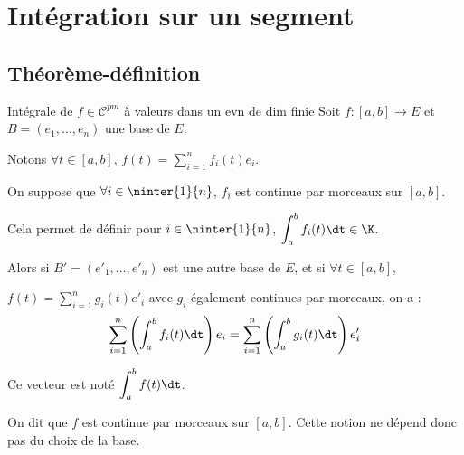\section{Intégration sur un segment}
\subsection{Théorème-définition}

\begin{theoreme}{Intégrale de $f \in \mathscr C^{pm}$ à valeurs dans un evn de dim finie}{}
    Soit $f : [a, b] \to E$ et $B = (e_1, \ldots, e_n)$ une base de $E$.

    Notons $\displaystyle \forall t \in [a, b], \, f(t) = \sum_{i=1}^n f_i(t)e_i$.

    On suppose que $\forall i \in \ninter{1}{n}$, $f_i$ est continue par morceaux sur $[a, b]$.

    Cela permet de définir pour $i \in \ninter{1}{n} $, $\displaystyle \int_a^b f_i(t) \dt \in \K$.

    Alors si $B' = (e'_1, \ldots, e'_n)$ est une autre base de $E$, et si 
    $\displaystyle \forall t \in [a, b]$,  
    
    $\displaystyle f(t) = \sum_{i=1}^n g_i(t)e'_i$ avec 
    $g_i$ également continues par morceaux, on a :
    \[\sum_{i=1}^n \left( \int_a^b f_i(t) \dt \right) e_i = \sum_{i=1}^n \left( \int_a^b g_i(t) \dt \right) e'_i\]

    Ce vecteur est noté $\displaystyle \int_a^b f(t) \dt$.

    On dit que $f$ est continue par morceaux sur $[a, b]$. Cette notion ne dépend donc pas 
    du choix de la base.
\end{theoreme}


